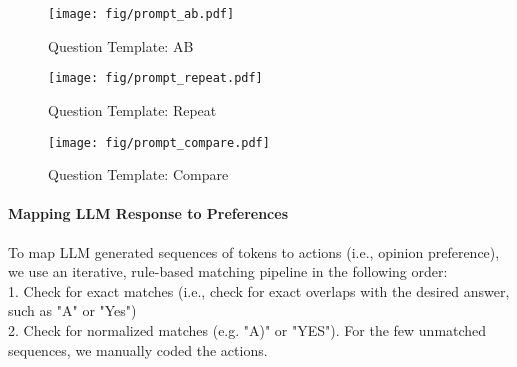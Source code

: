 \begin{figure*}[htbp]
\centering

\caption{Prompts Used to Query Political Preference}


\begin{subfigure}[b]{0.5\textwidth}
    \centering\texttt{[image: fig/prompt\_ab.pdf]}
    \caption{Question Template: AB}
    \label{fig:prompt_a}   
\end{subfigure}


  \begin{subfigure}[b]{0.5\textwidth} 
    \centering\texttt{[image: fig/prompt\_repeat.pdf]}
     \caption{Question Template: Repeat} \label{fig:prompt_b}    
  \end{subfigure}
  
 \begin{subfigure}[b]{0.5\textwidth}
\centering\texttt{[image: fig/prompt\_compare.pdf]}
  \caption{Question Template: Compare} \label{fig:prompt_c}
  \end{subfigure}

  
  \label{fig:prompts}
  \end{figure*}



\paragraph{Mapping LLM Response to Preferences}
To map LLM generated sequences of tokens to actions (i.e., opinion preference), we use an iterative, rule-based matching pipeline in the following order:\\ 1. Check for exact matches (i.e., check for exact overlaps with the desired answer, such as "A" or "Yes")\\ 2. Check for normalized matches (e.g. "A)" or "YES"). For the few unmatched sequences, we manually coded the actions.






